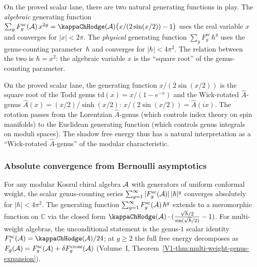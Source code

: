 \begin{remark}
On the proved scalar lane, there are two natural generating functions
in play. The \emph{algebraic} generating function
$\sum_g F_g^{\mathrm{sc}}(\cA)\,x^{2g}
= \kappaChHodge(\cA)\bigl(x/(2\sin(x/2)) - 1\bigr)$ uses the
real variable $x$ and converges for $|x| < 2\pi$. The \emph{physical}
generating function $\sum_g F_g^{\mathrm{sc}}\,\hbar^g$ uses the genus-counting
parameter~$\hbar$ and converges for $|\hbar| < 4\pi^2$. The relation
between the two is $\hbar = x^2$: the algebraic variable $x$ is the
``square root'' of the genus-counting parameter.
\end{remark}

\begin{remark}
On the proved scalar lane, the generating function $x/(2\sin(x/2))$ is
the square root of the Todd genus $\mathrm{td}(x) = x/(1-e^{-x})$ and
the Wick-rotated $\hat{A}$-genus $\hat{A}(x) = (x/2)/\sinh(x/2)$:
$x/(2\sin(x/2)) = \hat{A}(ix)$. The rotation passes from the Lorentzian
$\hat{A}$-genus (which controls index theory on spin manifolds) to the
Euclidean generating function (which controls genus integrals on moduli
spaces). The shadow free energy thus has a natural interpretation as a
``Wick-rotated $\hat{A}$-genus'' of the modular characteristic.
\end{remark}

\subsubsection{Absolute convergence from Bernoulli asymptotics}

\begin{theorem}
\label{thm:thqg-I-absolute-convergence}
For any modular Koszul chiral algebra $\mathcal{A}$ with generators of
uniform conformal weight, the
scalar genus-counting series
$\sum_{g=1}^{\infty} |F_g^{\mathrm{sc}}(\mathcal{A})|\,|\hbar|^g$
converges absolutely for $|\hbar| < 4\pi^2$. The generating function
$\sum_{g=1}^{\infty} F_g^{\mathrm{sc}}(\mathcal{A})\,\hbar^g$ extends to a meromorphic
function on $\mathbb{C}$ via the closed form
$\kappaChHodge(\cA) \cdot (\frac{\sqrt{\hbar}/2}{\sin(\sqrt{\hbar}/2)} - 1)$.
For multi-weight algebras, the unconditional statement is
the genus-$1$ scalar identity
$F_1^{\mathrm{sc}}(\cA)=\kappaChHodge(\cA)/24$;
at $g \geq 2$ the full free energy decomposes as
$F_g(\mathcal{A})=F_g^{\mathrm{sc}}(\mathcal{A})
+\delta F_g^{\mathrm{cross}}(\mathcal{A})$
\textup{(}Volume~I, Theorem~\textup{\ref*{V1-thm:multi-weight-genus-expansion}}\textup{)}.
\end{theorem}

